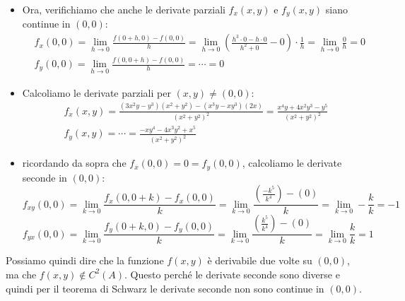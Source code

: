 \begin{itemize}
    \item Ora, verifichiamo che anche le derivate parziali \(f_x(x,y)\) e \(f_y(x,y)\) siano continue in \((0,0)\):
          \begin{align*}
               & f_x(0,0) = \lim_{ h \to 0 } \frac{f(0+h,0) - f(0,0)}{h} = \lim_{ h \to 0 } \left( \frac{h^{3}\cdot0 - h\cdot 0}{h^{2}+0} - 0 \right) \cdot  \frac{1}{h} = \lim_{ h \to 0 } \frac{0}{h} = 0 \\[2mm]
               & f_y(0,0) = \lim_{ h \to 0 } \frac{f(0,0+h) - f(0,0)}{h} = \cdots = 0
          \end{align*}

          \filbreak{}
    \item Calcoliamo le derivate parziali per \((x,y) \neq (0,0)\):
          \begin{align*}
               & f_x(x,y) = \frac{(3x^{2}y-y^{3})(x^{2}+y^{2})-(x^{3}y-xy^{3})(2x)}{{(x^{2}+y^{2})}^{2}} = \frac{x^{4}y+4x^{2}y^{3}-y^{5}}{{(x^{2}+y^{2})}^{2}} \\[2mm]
               & f_y(x,y) = \cdots = \frac{-xy^{4}-4x^{3}y^{2}+x^{5}}{{(x^{2}+y^{2})}^{2}}
          \end{align*}

    \item ricordando da sopra che \(f_x(0,0)=0=f_y(0,0)\), calcoliamo le derivate seconde in \((0,0)\):
          \[
              f_{xy} (0,0) = \lim_{ k \to 0 } \frac{f_x(0,0+k) - f_x(0,0)}{k} = \lim_{ k \to 0 } \frac{ \left( \frac{-k^{5}}{k^{4}} \right) - (0)}{k} = \lim_{ k \to 0 } - \frac{k}{k} = -1
          \]
          \[
              f_{yx}(0,0) = \lim_{ k \to 0 } \frac{f_y(0+k,0) - f_y(0,0)}{k} = \lim_{ k \to 0 } \frac{ \left( \frac{k^{5}}{k^{4}} \right) - (0)}{k} = \lim_{ k \to 0 } \frac{k}{k} = 1
          \]
\end{itemize}

Possiamo quindi dire che la funzione \(f(x,y)\) è derivabile due volte su \((0,0)\), ma che \(f(x,y) \notin C^2(A)\). Questo perché le derivate seconde sono diverse e quindi per il teorema di Schwarz le derivate seconde non sono continue in \((0,0)\).
